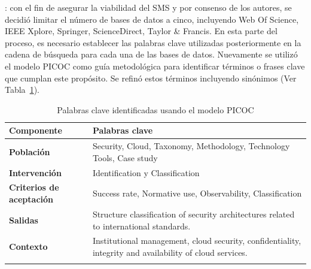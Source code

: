 : con el fin de asegurar la viabilidad del SMS y por consenso de los autores, se decidió limitar 
el número de bases de datos a cinco, incluyendo Web Of Science, IEEE Xplore, Springer, ScienceDirect, Taylor \& Francis. En esta parte 
del proceso, es necesario establecer las palabras clave utilizadas posteriormente en la cadena de búsqueda para cada una de las bases de 
datos. Nuevamente se utilizó el modelo PICOC como guía metodológica para identificar términos o frases clave que cumplan este propósito. 
Se refinó estos términos incluyendo sinónimos (Ver Tabla~\ref{table:picoc_keywords}).

\begin{table}[htbp]
	\centering
	\renewcommand{\arraystretch}{1}  %
	\begin{tabular}{p{1.8cm}p{6cm}}
		\toprule
		\textbf{Componente}              & \textbf{Palabras clave}                                                                                                                                                                                                                                                                 \\
		\midrule
		\textbf{Población}               & Security, Cloud, Taxonomy, Methodology, Technology Tools, Case study \\
		\addlinespace[0.8em]
		\textbf{Intervención}            & Identification y Classification                                                                                                                                                                                                                                                        \\
		\addlinespace[0.8em]
		\textbf{Criterios de aceptación} & Success rate, Normative use, Observability, Classification                                                                                                                                                                                            \\
		\addlinespace[0.8em]
		\textbf{Salidas}                 & Structure classification of security architectures related to international standards.                                                                                                                                                                                                                      \\
		\addlinespace[0.8em]
		\textbf{Contexto}                & Institutional management, cloud security, confidentiality, integrity and availability of cloud services.                                                                                                                    \\
		\bottomrule
		\vspace{2pt}
	\end{tabular}
	\caption{Palabras clave identificadas usando el modelo PICOC}\label{table:picoc_keywords}
\end{table}

